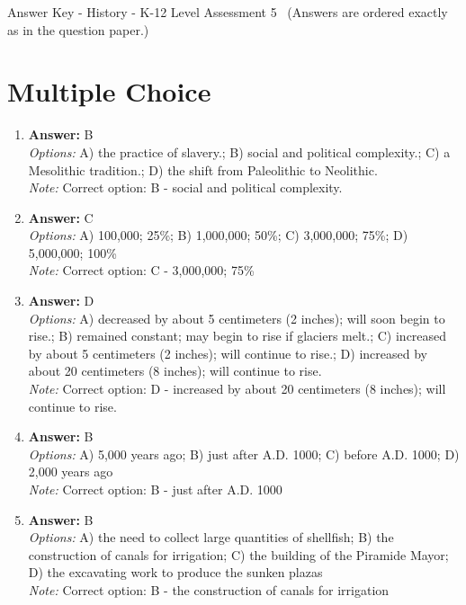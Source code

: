\documentclass[12pt]{article}
\begin{document}
\begin{center}
Answer Key - History - K-12 Level Assessment 5 \
\small (Answers are ordered exactly as in the question paper.)
\end{center}

\section*{Multiple Choice}
\begin{enumerate}[label=\arabic*.]
\item \textbf{Answer:} B
\\ \textit{Options:} A) the practice of slavery.; B) social and political complexity.; C) a Mesolithic tradition.; D) the shift from Paleolithic to Neolithic.
\\ \textit{Note:} Correct option: B - social and political complexity.
\item \textbf{Answer:} C
\\ \textit{Options:} A) 100,000; 25\%; B) 1,000,000; 50\%; C) 3,000,000; 75\%; D) 5,000,000; 100\%
\\ \textit{Note:} Correct option: C - 3,000,000; 75\%
\item \textbf{Answer:} D
\\ \textit{Options:} A) decreased by about 5 centimeters (2 inches); will soon begin to rise.; B) remained constant; may begin to rise if glaciers melt.; C) increased by about 5 centimeters (2 inches); will continue to rise.; D) increased by about 20 centimeters (8 inches); will continue to rise.
\\ \textit{Note:} Correct option: D - increased by about 20 centimeters (8 inches); will continue to rise.
\item \textbf{Answer:} B
\\ \textit{Options:} A) 5,000 years ago; B) just after A.D. 1000; C) before A.D. 1000; D) 2,000 years ago
\\ \textit{Note:} Correct option: B - just after A.D. 1000
\item \textbf{Answer:} B
\\ \textit{Options:} A) the need to collect large quantities of shellfish; B) the construction of canals for irrigation; C) the building of the Piramide Mayor; D) the excavating work to produce the sunken plazas
\\ \textit{Note:} Correct option: B - the construction of canals for irrigation
\end{enumerate}
\end{document}
